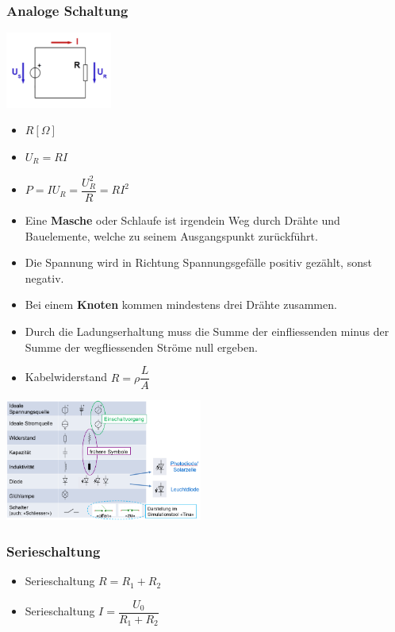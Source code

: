 \documentclass[6pt,a4paper]{scrartcl}
\begin{document}
\begin{multicols*}{4}
			\subsubsection{Analoge Schaltung}
				\begin{multicols*}{2}		
					\includegraphics[height=2.5cm]{img/schaltung.png}
					\begin{itemize}\itemsep0pt				
						\item $R[\Omega]$
						\item $U_{R}=RI$
						\item $P=IU_{R}=\dfrac{U_{R}^{2}}{R}=RI^{2}$
					\end{itemize}
				\end{multicols*}
				\begin{itemize}\itemsep0pt
					\item Eine \textbf{Masche} oder Schlaufe ist irgendein Weg durch Drähte und Bauelemente, welche zu seinem Ausgangspunkt zurückführt.
					\item Die Spannung wird in Richtung Spannungsgefälle positiv gezählt, sonst negativ.
					\item Bei einem \textbf{Knoten} kommen mindestens drei Drähte zusammen.
					\item Durch die Ladungserhaltung muss die Summe der einfliessenden minus der Summe der wegfliessenden Ströme null ergeben.
					\item Kabelwiderstand $R = \rho\dfrac{L}{A}$							\end{itemize}			
				\includegraphics[height=4cm]{img/schaltung2.png}	
				\subsubsection{Serieschaltung}	
					\begin{itemize}\itemsep0pt
						\item Serieschaltung $R = R_{1} + R_{2}$
						\item Serieschaltung $I = \dfrac{U_{0}}{R_{1} + R_{2}}$
					\end{itemize}

\end{multicols*}
\end{document}
